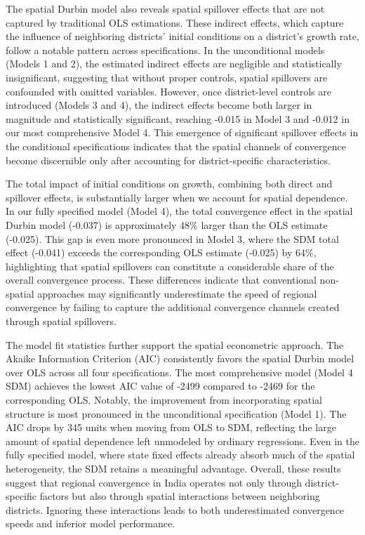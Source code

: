 \documentclass[
  a4paper, 
  twoside,
  review
]{article}
\begin{document}
The spatial Durbin model also reveals spatial spillover effects that are
not captured by traditional OLS estimations. These indirect effects,
which capture the influence of neighboring districts' initial conditions
on a district's growth rate, follow a notable pattern across
specifications. In the unconditional models (Models 1 and 2), the
estimated indirect effects are negligible and statistically
insignificant, suggesting that without proper controls, spatial
spillovers are confounded with omitted variables. However, once
district-level controls are introduced (Models 3 and 4), the indirect
effects become both larger in magnitude and statistically significant,
reaching -0.015 in Model 3 and -0.012 in our most comprehensive Model 4.
This emergence of significant spillover effects in the conditional
specifications indicates that the spatial channels of convergence become
discernible only after accounting for district-specific characteristics.

The total impact of initial conditions on growth, combining both direct
and spillover effects, is substantially larger when we account for
spatial dependence. In our fully specified model (Model 4), the total
convergence effect in the spatial Durbin model (-0.037) is approximately
48\% larger than the OLS estimate (-0.025). This gap is even more
pronounced in Model 3, where the SDM total effect (-0.041) exceeds the
corresponding OLS estimate (-0.025) by 64\%, highlighting that spatial
spillovers can constitute a considerable share of the overall
convergence process. These differences indicate that conventional
non-spatial approaches may significantly underestimate the speed of
regional convergence by failing to capture the additional convergence
channels created through spatial spillovers.

The model fit statistics further support the spatial econometric
approach. The Akaike Information Criterion (AIC) consistently favors the
spatial Durbin model over OLS across all four specifications. The most
comprehensive model (Model 4 SDM) achieves the lowest AIC value of -2499
compared to -2469 for the corresponding OLS. Notably, the improvement
from incorporating spatial structure is most pronounced in the
unconditional specification (Model 1). The AIC drops by 345 units when
moving from OLS to SDM, reflecting the large amount of spatial
dependence left unmodeled by ordinary regressions. Even in the fully
specified model, where state fixed effects already absorb much of the
spatial heterogeneity, the SDM retains a meaningful advantage. Overall,
these results suggest that regional convergence in India operates not
only through district-specific factors but also through spatial
interactions between neighboring districts. Ignoring these interactions
leads to both underestimated convergence speeds and inferior model
performance.
\end{document}
